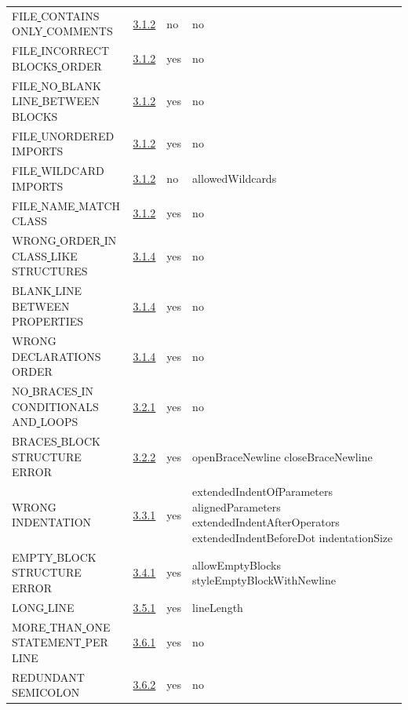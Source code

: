 \begin{longtable}{ |l|p{0.8cm}|p{0.8cm}| p{3cm} | }
FILE\underline{ }CONTAINS\underline{ }ONLY\underline{ }COMMENTS & \hyperref[sec:3.1.2]{3.1.2} &  no  &   no  \\
FILE\underline{ }INCORRECT\underline{ }BLOCKS\underline{ }ORDER & \hyperref[sec:3.1.2]{3.1.2} &  yes  &   no  \\
FILE\underline{ }NO\underline{ }BLANK\underline{ }LINE\underline{ }BETWEEN\underline{ }BLOCKS & \hyperref[sec:3.1.2]{3.1.2} &  yes  &   no  \\
FILE\underline{ }UNORDERED\underline{ }IMPORTS & \hyperref[sec:3.1.2]{3.1.2} &  yes  &   no  \\
FILE\underline{ }WILDCARD\underline{ }IMPORTS & \hyperref[sec:3.1.2]{3.1.2} &  no  &   allowedWildcards           \\
FILE\underline{ }NAME\underline{ }MATCH\underline{ }CLASS & \hyperref[sec:3.1.2]{3.1.2} &  yes  &   no  \\
WRONG\underline{ }ORDER\underline{ }IN\underline{ }CLASS\underline{ }LIKE\underline{ }STRUCTURES & \hyperref[sec:3.1.4]{3.1.4} &  yes  &   no  \\
BLANK\underline{ }LINE\underline{ }BETWEEN\underline{ }PROPERTIES & \hyperref[sec:3.1.4]{3.1.4} &  yes  &   no  \\
WRONG\underline{ }DECLARATIONS\underline{ }ORDER & \hyperref[sec:3.1.4]{3.1.4} &  yes  &   no  \\
NO\underline{ }BRACES\underline{ }IN\underline{ }CONDITIONALS\underline{ }AND\underline{ }LOOPS & \hyperref[sec:3.2.1]{3.2.1} &  yes  &   no  \\
BRACES\underline{ }BLOCK\underline{ }STRUCTURE\underline{ }ERROR & \hyperref[sec:3.2.2]{3.2.2} &  yes  &   openBraceNewline closeBraceNewline  \\
WRONG\underline{ }INDENTATION & \hyperref[sec:3.3.1]{3.3.1} &  yes  &  extendedIndentOfParameters alignedParameters extendedIndentAfterOperators extendedIndentBeforeDot indentationSize   \\
EMPTY\underline{ }BLOCK\underline{ }STRUCTURE\underline{ }ERROR & \hyperref[sec:3.4.1]{3.4.1} &  yes  &   allowEmptyBlocks styleEmptyBlockWithNewline  \\
LONG\underline{ }LINE & \hyperref[sec:3.5.1]{3.5.1} &  yes  &   lineLength                 \\
MORE\underline{ }THAN\underline{ }ONE\underline{ }STATEMENT\underline{ }PER\underline{ }LINE & \hyperref[sec:3.6.1]{3.6.1} &  yes  &   no  \\
REDUNDANT\underline{ }SEMICOLON & \hyperref[sec:3.6.2]{3.6.2} &  yes  &   no  \\

\end{longtable}
